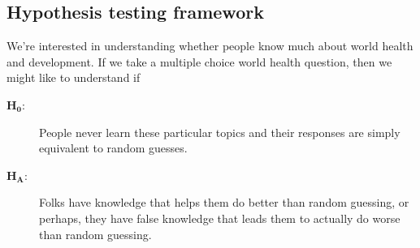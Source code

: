 

\subsection{Hypothesis testing framework}

We're interested in understanding whether people know much
about world health and development. If we take a multiple choice
world health question, then we might like to understand if
\begin{description}
\item[$\mathbf{H_0}$:]
    People never learn these particular topics and their
    responses are simply equivalent to random guesses.
\item[$\mathbf{H_A}$:]
    Folks have knowledge that helps them do better
    than random guessing, or perhaps, they have false knowledge
    that leads them to actually do worse than random guessing.
\end{description}
%
